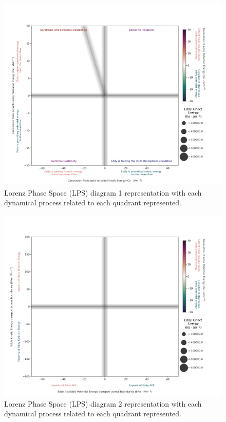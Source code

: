\begin{figure}[!htbp]
\centering
\includegraphics[width=\textwidth]{figs_6/lps_example_mixed.png}
\caption[LPS 1 - Dynamical Processes]{Lorenz Phase Space (LPS) diagram 1 representation with each dynamical process related to each quadrant represented.}
\label{fig:lps_example_mixed}
\end{figure}

\begin{figure}[!htbp]
\centering
\includegraphics[width=\textwidth]{figs_6/lps_example_imports.png}
\caption[LPS 2 - Dynamical Processes]{Lorenz Phase Space (LPS) diagram 2 representation with each dynamical process related to each quadrant represented.}
\label{fig:lps_example_imports}
\end{figure}

